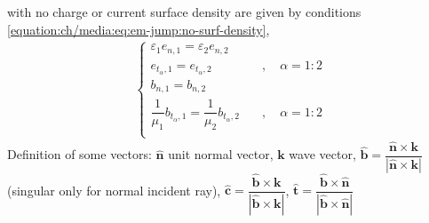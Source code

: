\documentclass[letterpaper,10pt,italian]{jupyterBook}
\begin{document}
\sphinxAtStartPar
{\hyperref[\detokenize{ch/media:classical-electromagnetism-media-jump}]{}} with no charge or current surface density are given by conditions \eqref{equation:ch/media:eq:em-jump:no-surf-density},
\begin{equation*}
\begin{split}\begin{cases}
  \varepsilon_1 e_{n,1} = \varepsilon_2 e_{n,2} \\
  e_{t_{\alpha},1} = e_{t_{\alpha},2}                                    & \quad , \quad \alpha=1:2 \\
  b_{n,1} = b_{n,2}  \\
  \dfrac{1}{\mu_1} b_{t_{\alpha},1} = \dfrac{1}{\mu_2} b_{t_{\alpha},2}  & \quad , \quad \alpha=1:2 \\
\end{cases}\end{split}
\end{equation*}
\sphinxAtStartPar
Definition of some vectors: \(\hat{\mathbf{n}}\) unit normal vector, \(\mathbf{k}\) wave vector, \(\hat{\mathbf{b}} = \dfrac{\hat{\mathbf{n}} \times \mathbf{k}}{|\hat{\mathbf{n}} \times \mathbf{k}|}\) (singular only for normal incident ray), \(\hat{\mathbf{c}} = \dfrac{\hat{\mathbf{b}} \times \mathbf{k}}{|\hat{\mathbf{b}} \times \mathbf{k}|}\), \(\hat{\mathbf{t}} = \dfrac{\hat{\mathbf{b}} \times \hat{\mathbf{n}}}{|\hat{\mathbf{b}} \times \hat{\mathbf{n}}|}\)
\end{document}
